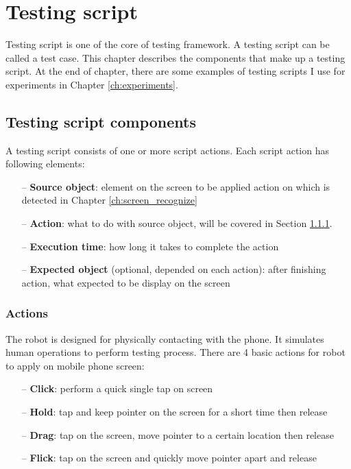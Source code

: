 \chapter{Testing script}
Testing script is one of the core of testing framework.
A testing script can be called a test case.
This chapter describes the components that make up a testing script. At the end of chapter, there are some examples of testing scripts I use for experiments in Chapter \ref{ch:experiments}.

\section{Testing script components}
A testing script consists of one or more script actions. Each script action has following elements:
    \begin{itemize}
		\item[--] \textbf{Source object}: element on the screen to be applied action on which is detected in Chapter \ref{ch:screen_recognize}
		\item[--] \textbf{Action}: what to do with source object, will be covered in Section \ref{sec:actions}.
		\item[--] \textbf{Execution time}: how long it takes to complete the action
		\item[--] \textbf{Expected object} (optional, depended on each action): after finishing action, what expected to be display on the screen
	\end{itemize}

\subsection{Actions}
\label{sec:actions}
The robot is designed for physically contacting with the phone. It simulates human operations to perform testing process.
There are 4 basic actions for robot to apply on mobile phone screen:
    \begin{itemize}
		\item[--] \textbf{Click}: perform a quick single tap on screen
		\item[--] \textbf{Hold}: tap and keep pointer on the screen for a short time then release
		\item[--] \textbf{Drag}: tap on the screen, move pointer to a certain location then release
		\item[--] \textbf{Flick}: tap on the screen and quickly move pointer apart and release
	\end{itemize}

